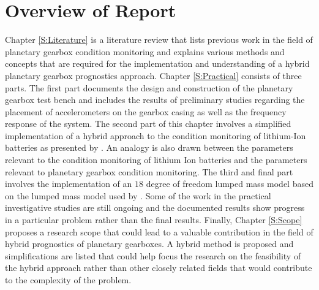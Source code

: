 \section{Overview of Report}
Chapter \ref{S:Literature} is a literature review that lists previous work in the field of planetary gearbox condition monitoring and explains various methods and concepts that are required for the implementation and understanding of a hybrid planetary gearbox prognostics approach.
Chapter \ref{S:Practical} consists of three parts. The first part documents the design and construction of the planetary gearbox test bench and includes the results of preliminary studies regarding the placement of accelerometers on the gearbox casing as well as the frequency response of the system. The second part of this chapter involves a simplified implementation of a hybrid approach to the condition monitoring of lithium-Ion batteries as presented by \cite{Liao2016}. An analogy is also drawn between the parameters relevant to the condition monitoring of lithium Ion batteries and the parameters relevant to planetary gearbox condition monitoring. The third and final part involves the implementation of an $18$ degree of freedom lumped mass model based on the lumped mass model used by \cite{Chaari2006}. Some of the work in the practical investigative studies are still ongoing and the documented results show progress in a particular problem rather than the final results. Finally, Chapter \ref{S:Scope} proposes a research scope that could lead to a valuable contribution in the field of hybrid prognostics of planetary gearboxes. A hybrid method is proposed and simplifications are listed that could help focus the research on the feasibility of the hybrid approach rather than other closely related fields that would contribute to the complexity of the problem.




